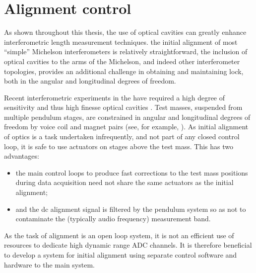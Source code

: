 \chapter{\label{a:alignment-control}Alignment control}
As shown throughout this thesis, the use of optical cavities can greatly enhance interferometric length measurement techniques.  the initial alignment of most ``simple'' Michelson interferometers is relatively straightforward, the inclusion of optical cavities to the arms of the Michelson, and indeed other interferometer topologies, provides an additional challenge in obtaining and maintaining lock, both in the angular and longitudinal degrees of freedom.

Recent interferometric experiments in the \GLASGOWTENM have required a high degree of sensitivity and thus high finesse optical cavities . Test masses, suspended from multiple pendulum stages, are constrained in angular and longitudinal degrees of freedom by voice coil and magnet pairs (see, for example, ). As initial alignment of optics is a task undertaken infrequently, and not part of any closed control loop, it is safe to use actuators on stages above the test mass. This has two advantages:
\begin{itemize}
 \item the main control loops to produce fast corrections to the test mass positions during data acquisition need not share the same actuators as the initial alignment;
 \item and the dc alignment signal is filtered by the pendulum system so as not to contaminate the (typically audio frequency) measurement band.
\end{itemize}
As the task of alignment is an open loop system, it is not an efficient use of resources to dedicate high dynamic range ADC channels. It is therefore beneficial to develop a system for initial alignment using separate control software and hardware to the main system.

